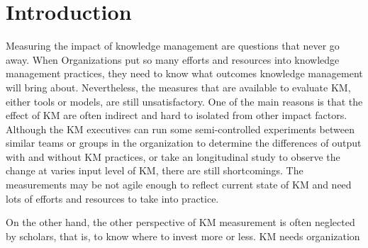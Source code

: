 \documentclass{elsarticle}
\begin{document}
\section{ Introduction}
Measuring  the impact of knowledge management are questions that never
go away. When Organizations put so many efforts and resources into
knowledge management practices, they need to know what outcomes
knowledge management will bring about.  Nevertheless,  the measures that are
available to evaluate KM, either tools or models, are still
unsatisfactory.  One of the main reasons is that the effect of KM are
often indirect and hard to isolated from other impact
factors. Although the KM executives can run some semi-controlled
experiments between similar teams or groups in the organization to
determine the differences of  output with and without KM practices, or
take an longitudinal study  to observe the change at varies input
level of KM, there are still shortcomings. The measurements may be not
 agile enough to reflect current state of KM and need lots of efforts
 and resources to take into practice.   

 On the other hand, the other
 perspective of KM measurement is often neglected by scholars, that
 is, to know where to invest more or less.  KM needs organization  
\end{document}
